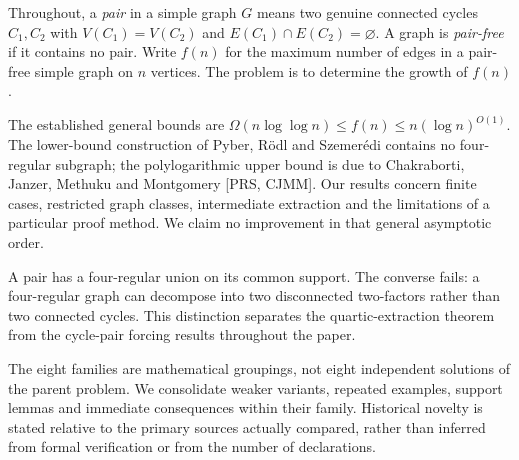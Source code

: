 \documentclass[
  11pt,
]{article}
\begin{document}
Throughout, a \emph{pair} in a simple graph \(G\) means two genuine
connected cycles \(C_1,C_2\) with \(V(C_1)=V(C_2)\) and
\(E(C_1)\cap E(C_2)=\varnothing\). A graph is \emph{pair-free} if it
contains no pair. Write \(f(n)\) for the maximum number of edges in a
pair-free simple graph on \(n\) vertices. The problem is to determine
the growth of \(f(n)\).

The established general bounds are
\(\Omega(n\log\log n)\leq f(n)\leq n(\log n)^{O(1)}\). The lower-bound
construction of Pyber, Rödl and Szemerédi contains no four-regular
subgraph; the polylogarithmic upper bound is due to Chakraborti, Janzer,
Methuku and Montgomery {[}PRS, CJMM{]}. Our results concern finite
cases, restricted graph classes, intermediate extraction and the
limitations of a particular proof method. We claim no improvement in
that general asymptotic order.

A pair has a four-regular union on its common support. The converse
fails: a four-regular graph can decompose into two disconnected
two-factors rather than two connected cycles. This distinction separates
the quartic-extraction theorem from the cycle-pair forcing results
throughout the paper.

The eight families are mathematical groupings, not eight independent
solutions of the parent problem. We consolidate weaker variants,
repeated examples, support lemmas and immediate consequences within
their family. Historical novelty is stated relative to the primary
sources actually compared, rather than inferred from formal verification
or from the number of declarations.
\end{document}
